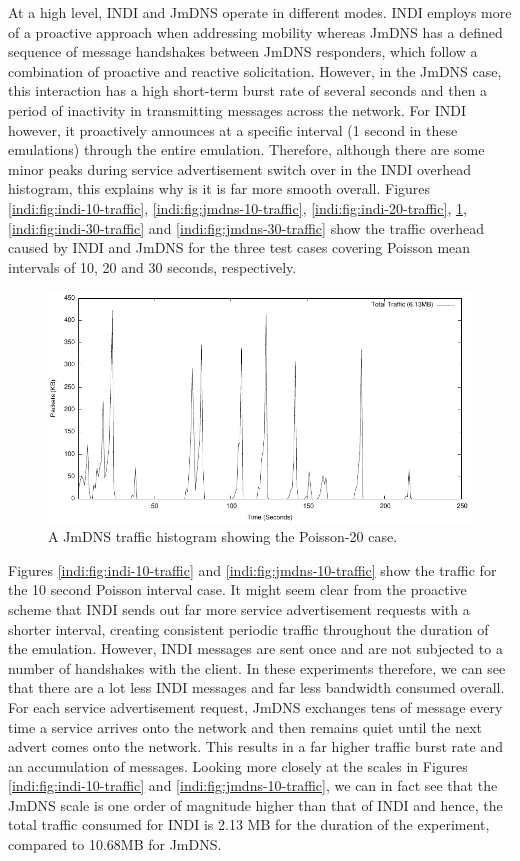 At a high level, INDI and JmDNS operate in different modes.  INDI employs more of a proactive approach when addressing mobility whereas JmDNS has a defined sequence of message handshakes between JmDNS responders, which follow a combination of proactive and reactive solicitation.  However, in the JmDNS case, this interaction has a high short-term burst rate of several seconds and then a period of inactivity in transmitting messages across the network.  For INDI however, it proactively announces at a specific interval (1 second in these emulations) through the entire emulation. Therefore, although there are some minor peaks during service advertisement switch over in the INDI overhead histogram, this explains why is it is far more smooth overall.   Figures \ref{indi:fig:indi-10-traffic}, \ref{indi:fig:jmdns-10-traffic}, \ref{indi:fig:indi-20-traffic}, \ref{indi:fig:jmdns-20-traffic}, \ref{indi:fig:indi-30-traffic} and \ref{indi:fig:jmdns-30-traffic} show the traffic overhead caused by INDI and JmDNS for the three test cases covering Poisson mean intervals of 10, 20 and 30 seconds, respectively.

\begin{figure}
\centering
\includegraphics[scale=1.0]{jmdns20packet-distribution.pdf}
\caption{A JmDNS traffic histogram showing the Poisson-20 case.   } 
\label{indi:fig:jmdns-20-traffic}
\end{figure}

 Figures \ref{indi:fig:indi-10-traffic} and \ref{indi:fig:jmdns-10-traffic} show the traffic for the 10  second Poisson interval case.   It might seem clear from the proactive scheme that INDI sends out far more service advertisement requests with a shorter interval, creating consistent periodic traffic throughout the duration of the emulation. However, INDI messages are sent once and are not subjected to a number of handshakes with the client. In these experiments therefore, we can see that there are a lot less INDI messages and far less bandwidth consumed overall.  For each service advertisement request, JmDNS exchanges tens of message every time a service arrives onto the network and then remains quiet until the next advert comes onto the network.  This results in a far higher traffic burst rate and an accumulation of messages. Looking more closely at the scales in Figures \ref{indi:fig:indi-10-traffic} and \ref{indi:fig:jmdns-10-traffic}, we can in fact see that the JmDNS scale is one order of magnitude higher than that of INDI and hence, the total traffic consumed for INDI is 2.13 MB for the duration of the experiment, compared to 10.68MB for JmDNS. 
  
